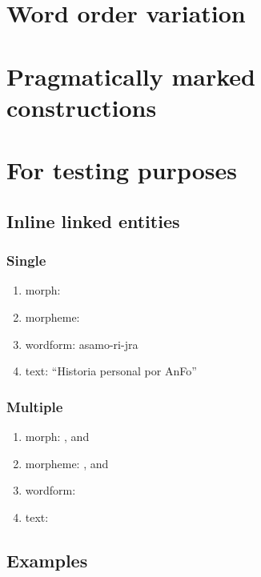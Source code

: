 \documentclass{memoir}
\begin{document}
\chapter{\texorpdfstring{Word order variation
\label{wordorder}}{Word order variation }}

\chapter{\texorpdfstring{Pragmatically marked constructions
\label{marked}}{Pragmatically marked constructions }}

\chapter{For testing purposes}

\section{Inline linked entities}

\subsection{Single}

\begin{enumerate}
\def\labelenumi{\arabic{enumi}.}
\tightlist
\item
  morph: 
\item
  morpheme: 
\item
  wordform: asamo-ri-jra
\item
  text: ``Historia personal por AnFo''
\end{enumerate}

\subsection{Multiple}

\begin{enumerate}
\def\labelenumi{\arabic{enumi}.}
\tightlist
\item
  morph: , and 
\item
  morpheme: , and 
\item
  wordform:\\
\item
  text:
\end{enumerate}

\section{Examples}
\end{document}
